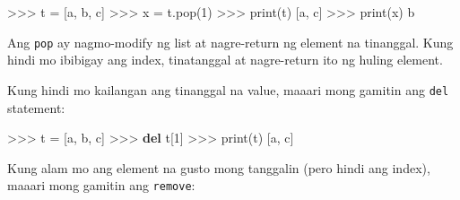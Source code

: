 \documentclass[10pt,]{book}
\newenvironment{Shaded}{}{}
\newcommand{\BuiltInTok}[1]{\textcolor[rgb]{0.00,0.50,0.00}{#1}}
\newcommand{\DecValTok}[1]{\textcolor[rgb]{0.25,0.63,0.44}{#1}}
\newcommand{\KeywordTok}[1]{\textcolor[rgb]{0.00,0.44,0.13}{\textbf{#1}}}
\newcommand{\NormalTok}[1]{#1}
\newcommand{\OperatorTok}[1]{\textcolor[rgb]{0.40,0.40,0.40}{#1}}
\newcommand{\StringTok}[1]{\textcolor[rgb]{0.25,0.44,0.63}{#1}}
\begin{document}
\begin{Shaded}
\begin{Highlighting}[]
\OperatorTok{\textgreater{}\textgreater{}\textgreater{}}\NormalTok{ t }\OperatorTok{=}\NormalTok{ [}\StringTok{\textquotesingle{}a\textquotesingle{}}\NormalTok{, }\StringTok{\textquotesingle{}b\textquotesingle{}}\NormalTok{, }\StringTok{\textquotesingle{}c\textquotesingle{}}\NormalTok{]}
\OperatorTok{\textgreater{}\textgreater{}\textgreater{}}\NormalTok{ x }\OperatorTok{=}\NormalTok{ t.pop(}\DecValTok{1}\NormalTok{)}
\OperatorTok{\textgreater{}\textgreater{}\textgreater{}} \BuiltInTok{print}\NormalTok{(t)}
\NormalTok{[}\StringTok{\textquotesingle{}a\textquotesingle{}}\NormalTok{, }\StringTok{\textquotesingle{}c\textquotesingle{}}\NormalTok{]}
\OperatorTok{\textgreater{}\textgreater{}\textgreater{}} \BuiltInTok{print}\NormalTok{(x)}
\NormalTok{b}
\end{Highlighting}
\end{Shaded}

Ang \texttt{pop} ay nagmo-modify ng list at nagre-return ng element na
tinanggal. Kung hindi mo ibibigay ang index, tinatanggal at nagre-return
ito ng huling element.

Kung hindi mo kailangan ang tinanggal na value, maaari mong gamitin ang
\texttt{del} statement:

 

\begin{Shaded}
\begin{Highlighting}[]
\OperatorTok{\textgreater{}\textgreater{}\textgreater{}}\NormalTok{ t }\OperatorTok{=}\NormalTok{ [}\StringTok{\textquotesingle{}a\textquotesingle{}}\NormalTok{, }\StringTok{\textquotesingle{}b\textquotesingle{}}\NormalTok{, }\StringTok{\textquotesingle{}c\textquotesingle{}}\NormalTok{]}
\OperatorTok{\textgreater{}\textgreater{}\textgreater{}} \KeywordTok{del}\NormalTok{ t[}\DecValTok{1}\NormalTok{]}
\OperatorTok{\textgreater{}\textgreater{}\textgreater{}} \BuiltInTok{print}\NormalTok{(t)}
\NormalTok{[}\StringTok{\textquotesingle{}a\textquotesingle{}}\NormalTok{, }\StringTok{\textquotesingle{}c\textquotesingle{}}\NormalTok{]}
\end{Highlighting}
\end{Shaded}

Kung alam mo ang element na gusto mong tanggalin (pero hindi ang index),
maaari mong gamitin ang \texttt{remove}:

 
\end{document}
